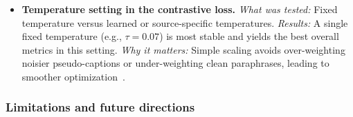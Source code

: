 \begin{enrichment}
\begin{enrichment}
\begin{itemize}
            \item \textbf{Temperature setting in the contrastive loss.} \emph{What was tested:} Fixed temperature versus learned or source\mbox{-}specific temperatures. \emph{Results:} A single fixed temperature (e.g., $\tau{=}0.07$) is most stable and yields the best overall metrics in this setting. \emph{Why it matters:} Simple scaling avoids over\mbox{-}weighting noisier pseudo\mbox{-}captions or under\mbox{-}weighting clean paraphrases, leading to smoother optimization~\cite{zhao2022_lavila}.
        \end{itemize}
        
        \newpage
        
        \subsubsection{Limitations and future directions}
        \label{subsubsec:chapter24_lavila_limits}
        

\end{enrichment}
\end{enrichment}
